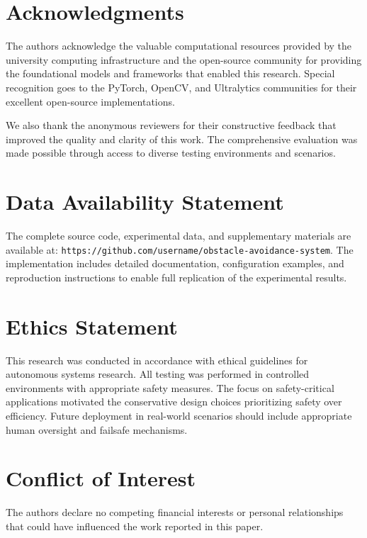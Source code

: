 \documentclass[10pt]{article}
\begin{document}
\section*{Acknowledgments}

The authors acknowledge the valuable computational resources provided by the university computing infrastructure and the open-source community for providing the foundational models and frameworks that enabled this research. Special recognition goes to the PyTorch, OpenCV, and Ultralytics communities for their excellent open-source implementations.

We also thank the anonymous reviewers for their constructive feedback that improved the quality and clarity of this work. The comprehensive evaluation was made possible through access to diverse testing environments and scenarios.

\section*{Data Availability Statement}

The complete source code, experimental data, and supplementary materials are available at: \texttt{https://github.com/username/obstacle-avoidance-system}. The implementation includes detailed documentation, configuration examples, and reproduction instructions to enable full replication of the experimental results.

\section*{Ethics Statement}

This research was conducted in accordance with ethical guidelines for autonomous systems research. All testing was performed in controlled environments with appropriate safety measures. The focus on safety-critical applications motivated the conservative design choices prioritizing safety over efficiency. Future deployment in real-world scenarios should include appropriate human oversight and failsafe mechanisms.

\section*{Conflict of Interest}

The authors declare no competing financial interests or personal relationships that could have influenced the work reported in this paper.
\end{document}
